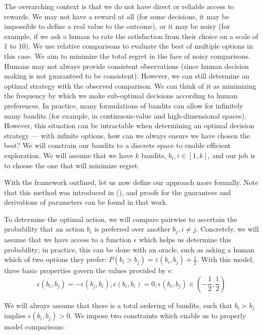 \documentclass[
  letterpaper,
  numbers=noenddot,
  DIV=11,
  oneside]{scrreprt}
\theoremstyle{remark}
\begin{document}
The overarching context is that we do not have direct or reliable access
to rewards. We may not have a reward at all (for some decisions, it may
be impossible to define a real value to the outcome), or it may be noisy
(for example, if we ask a human to rate the satisfaction from their
choice on a scale of 1 to 10). We use relative comparisons to evaluate
the best of multiple options in this case. We aim to minimize the total
regret in the face of noisy comparisons. Humans may not always provide
consistent observations (since human decision making is not guaranteed
to be consistent). However, we can still determine an optimal strategy
with the observed comparison. We can think of it as minimizing the
frequency by which we make sub-optimal decisions according to human
preferences. In practice, many formulations of bandits can allow for
infinitely many bandits (for example, in continuous-value and
high-dimensional spaces). However, this situation can be intractable
when determining an optimal decision strategy --- with infinite options,
how can we always ensure we have chosen the best? We will constrain our
bandits to a discrete space to enable efficient exploration. We will
assume that we have \(k\) bandits, \(b_i, i \in [1, k]\), and our job is
to choose the one that will minimize regret.

With the framework outlined, let us now define our approach more
formally. Note that this method was introduced in
(), and proofs for the
guarantees and derivations of parameters can be found in that work.

To determine the optimal action, we will compare pairwise to ascertain
the probability that an action \(b_i\) is preferred over another
\(b_j, i \ne j\). Concretely, we will assume that we have access to a
function \(\epsilon\) which helps us determine this probability; in
practice, this can be done with an oracle, such as asking a human which
of two options they prefer:
\(P(b_i > b_j) = \varepsilon(b_i, b_j) + \frac{1}{2}\). With this model,
three basic properties govern the values provided by \(\epsilon\):
\[\epsilon(b_i, b_j) = -\epsilon(b_j, b_i), \epsilon(b_i, b_i) = 0, \epsilon(b_i, b_j) \in \left(-\frac{1}{2}, \frac{1}{2} \right)\]

We will always assume that there is a total ordering of bandits, such
that \(b_i \succ b_j\) implies \(\epsilon(b_i, b_j) > 0\). We impose two
constraints which enable us to properly model comparisons:
\end{document}
